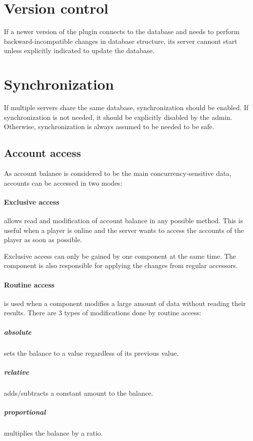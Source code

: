\documentclass{report}
\begin{document}
			\section{Version control}

				If a newer version of the plugin connects to the database and needs to perform backward-incompatible changes in database structure,
				its server cannont start unless explicitly indicated to update the database.

			\section{Synchronization}

				If multiple servers share the same database, synchronization should be enabled.
				If synchronization is not needed, it should be explicitly disabled by the admin.
				Otherwise, synchronization is always assumed to be needed to be safe.

				\subsection{Account access}

					As account balance is considered to be the main concurrency-sensitive data, accounts can be accessed in two modes:

					\paragraph{Exclusive access} allows read and modification of account balance in any possible method.
						This is useful when a player is online and the server wants to access the accounts of the player as soon as possible.

						Exclusive access can only be gained by one component at the same time.
						The component is also responsible for applying the changes from regular accessors.

					\paragraph{Routine access} is used when a component modifies a large amount of data without reading their results.
						There are 3 types of modifications done by routine access:
						\subparagraph{absolute} sets the balance to a value regardless of its previous value.
						\subparagraph{relative} adds/subtracts a constant amount to the balance.
						\subparagraph{proportional} multiplies the balance by a ratio.
\end{document}
